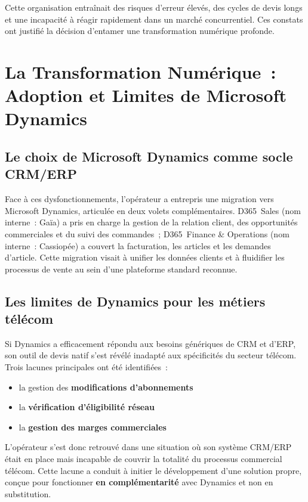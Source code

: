 Cette organisation entra\^inait des risques d'erreur \'elev\'es, des cycles de devis longs et une incapacit\'e \`a r\'eagir rapidement dans un march\'e concurrentiel. Ces constats ont justifi\'e la d\'ecision d'entamer une transformation num\'erique profonde.

\section{La Transformation Num\'erique~: Adoption et Limites de Microsoft Dynamics}

\subsection{Le choix de Microsoft Dynamics comme socle CRM/ERP}

Face \`a ces dysfonctionnements, l'op\'erateur a entrepris une migration vers Microsoft Dynamics, articul\'ee en deux volets compl\'ementaires. D365~Sales (nom interne~: Ga\"ia) a pris en charge la gestion de la relation client, des opportunit\'es commerciales et du suivi des commandes~; D365~Finance \& Operations (nom interne~: Cassiop\'ee) a couvert la facturation, les articles et les demandes d'article. Cette migration visait \`a unifier les donn\'ees clients et \`a fluidifier les processus de vente au sein d'une plateforme standard reconnue.

\subsection{Les limites de Dynamics pour les m\'etiers t\'el\'ecom}

Si Dynamics a efficacement r\'epondu aux besoins g\'en\'eriques de CRM et d'ERP, son outil de devis natif s'est r\'ev\'el\'e inadapt\'e aux sp\'ecificit\'es du secteur t\'el\'ecom. Trois lacunes principales ont \'et\'e identifi\'ees~:

\begin{itemize}
    \item la gestion des \textbf{modifications d'abonnements} 
    \item la \textbf{v\'erification d'\'eligibilit\'e r\'eseau} 
    \item la \textbf{gestion des marges commerciales} 
\end{itemize}

L'op\'erateur s'est donc retrouv\'e dans une situation o\`u son syst\`eme CRM/ERP \'etait en place mais incapable de couvrir la totalit\'e du processus commercial t\'el\'ecom. Cette lacune a conduit \`a initier le d\'eveloppement d'une solution propre, con\c{c}ue pour fonctionner \textbf{en compl\'ementarit\'e} avec Dynamics et non en substitution.


